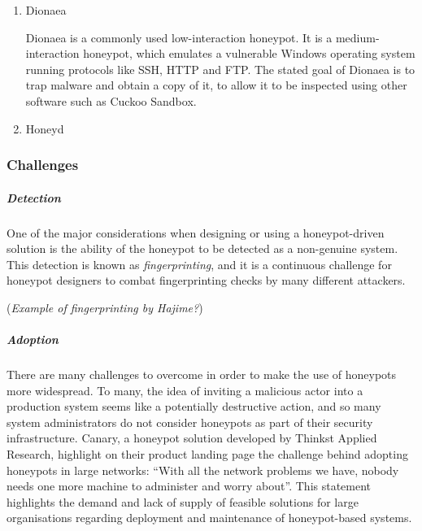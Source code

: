 {\begin{enumerate}
\begin{itemize}
		\item Cowrie records interactions between the attacker and the honeypot, logging everything from commands executed and file downloads attempted to the source IP addresses and protocol information.
		
		\item Cowrie does not limit the number of simultaneous sessions, and can present a mock filesystem and shell to each attacker independently.
		
		\item The fact that the Cowrie software doesn't call on any external sofware to operate makes it much less vulnerable to third-party compromises. It also improves substantially on its predecessor, Kippo, in that many of the fingerprinting issues are resolved.
	\end{itemize}

	Cowrie cannot execute malware, but can be used in conjunction with other solutions such as Cuckoo Sandbox {https://github.com/cuckoosandbox/cuckoo , accessed 24th March 2018} in order to execute and analyse malware safely in a controlled environment.
	
	\item Dionaea
	
	Dionaea is a commonly used low-interaction honeypot. It is a medium-interaction honeypot, which emulates a vulnerable Windows operating system running protocols like SSH, HTTP and FTP. The stated goal of Dionaea is to trap malware and obtain a copy of it, to allow it to be inspected using other software such as Cuckoo Sandbox.
	
	
	\item Honeyd 
	
\end{enumerate}

\subsubsection{Challenges}
	\subparagraph{Detection}
	One of the major considerations when designing or using a honeypot-driven solution is the ability of the honeypot to be detected as a non-genuine system. This detection is known as \textit{fingerprinting}, and it is a continuous challenge for honeypot designers to combat fingerprinting checks by many different attackers.
	
	(\textit{Example of fingerprinting by Hajime?})

	\subparagraph{Adoption}
	There are many challenges to overcome in order to make the use of honeypots more widespread. To many, the idea of inviting a malicious actor into a production system seems like a potentially destructive action, and so many system administrators do not consider honeypots as part of their security infrastructure. Canary, a honeypot solution developed by Thinkst Applied Research,  highlight on their product landing page the challenge behind adopting honeypots in large networks: “With all the network problems we have, nobody needs one more machine to administer and worry about”. This statement highlights the demand and lack of supply of feasible solutions for large organisations regarding deployment and maintenance of honeypot-based systems. 
	
}
